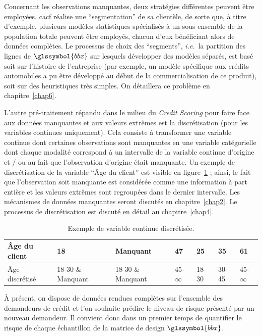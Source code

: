 Concernant les observations manquantes, deux stratégies différentes peuvent être employées. \gls{cacf} réalise une ``segmentation'' de sa clientèle, de sorte que, à titre d'exemple, plusieurs modèles statistiques spécialisés à un sous-ensemble de la population totale peuvent être employés, chacun d'eux bénéficiant alors de données complètes. 
Le processus de choix des ``segments'', \textit{i.e.}\ la partition des lignes de $\glssymbol{bbx}$ sur lesquels développer des modèles séparés, est basé soit sur l'histoire de l'entreprise (par exemple, un modèle spécifique aux crédits automobiles a pu être développé au début de la commercialisation de ce produit), soit sur des heuristiques très simples. On détaillera ce problème en chapitre~\ref{chap6}.

L'autre pré-traitement répandu dans le milieu du \textit{Credit Scoring} pour faire face aux données manquantes et aux valeurs extrêmes est la discrétisation (pour les variables continues uniquement). Cela consiste à transformer une variable continue dont certaines observations sont manquantes en une variable catégorielle dont chaque modalité correspond à un intervalle de la variable continue d'origine et / ou au fait que l'observation d'origine était manquante. Un exemple de discrétisation de la variable ``Âge du client'' est visible en figure~\ref{tab:disc_ex} ; ainsi, le fait que l'observation soit manquante est considérée comme une information à part entière et les valeurs extrêmes sont regroupées dans le dernier intervalle. Les mécanismes de données manquantes seront discutés en chapitre~\ref{chap2}. Le processus de discrétisation est discuté en détail au chapitre~\ref{chap4}.

\begin{table}
\centering
\caption{\label{tab:disc_ex} Exemple de variable continue discrétisée.}
\begin{tabular}{l|l|l|l|l|l|l}
Âge du client & 18 & Manquant & 47 & 25 & 35 & 61 \\
\hline
Âge discrétisé & 18-30 \& Manquant & 18-30 \& Manquant & 45-$\infty$ & 18-30 & 30-45 & 45-$\infty$ \\
\end{tabular}
\end{table}

\`A présent, on dispose de données rendues complètes sur l'ensemble des demandeurs de crédit et l'on souhaite prédire le niveau de risque présenté par un nouveau demandeur. Il convient donc dans un premier temps de quantifier le risque de chaque échantillon de la matrice de design $\glssymbol{bbx}$.

